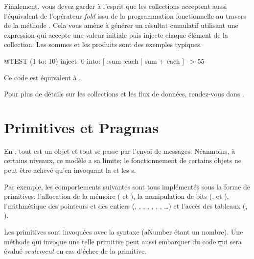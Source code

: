 \documentclass[a4paper,10pt,twoside]{book}
\begin{document}

Finalement, vous devez garder \`{a} l'esprit que les collections
acceptent aussi l'\'equivalent de l'op\'erateur \emph{fold}
issu de la programmation fonctionnelle au travers de 
la m\'{e}thode .
Cela vous am\`{e}ne \`{a} g\'{e}n\'{e}rer un r\'{e}sultat cumulatif
utilisant une expression qui accepte une valeur initiale puis 
injecte chaque \'{e}l\'{e}ment de la collection.
Les sommes et les produits sont des exemples typiques.

\begin{code}{@TEST}
(1 to: 10) inject: 0 into: [ :sum :each | sum + each ] --> 55
\end{code}

\noindent
Ce code est \'{e}quivalent \`{a} .

Pour plus de d\'{e}tails sur les collections et les flux de donn\'ees,
rendez-vous dans .

\section{Primitives et Pragmas}

En \st, tout est un objet et tout se passe par l'envoi de messages.
N\'{e}anmoins, \`{a} certains niveaux, ce mod\`ele a sa limite;
le fonctionnement de certains objets ne peut \^{e}tre achev\'e qu'en
invoquant la  et les s.

Par exemple, les comportements suivantes sont tous impl\'{e}ment\'{e}s 
sous la forme de primitives:
l'allocation de la m\'{e}moire ( et ),
la manipulation de bits (,
 et ),
l'arithm\'{e}tique des pointeurs et des entiers (\ct{+}, \ct{-},  \ct{<},  \ct{>}, \ct{*}, \ct{/ }, \ct{=}, \ct{==}\ldots)
et l'acc\`{e}s des tableaux (, ).

Les primitives sont invoqu\'{e}es avec la syntaxe   (aNumber \'etant un nombre).
Une m\'{e}thode qui invoque une telle primitive peut aussi embarquer
du code \st qui sera \'{e}valu\'{e}  \emph{seulement} en cas d'\'echec
de la primitive.
\end{document}
